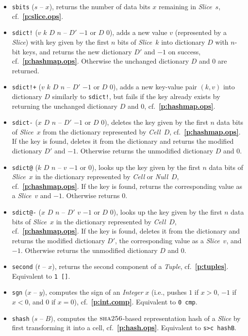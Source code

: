 \documentclass[12pt,oneside]{article}
\def\refpoint#1{{\rm\textbf{\ref{#1}}}}
\let\ptref=\refpoint
\def\opsc#1{\operatorname{\textsc{#1}}}
\def\Sha{\opsc{sha256}}
\begin{document}
\begin{itemize}
\item {\tt sbits} ($s$ -- $x$), returns the number of data bits $x$ remaining in {\em Slice}~$s$, cf.~\ptref{p:slice.ops}.
\item {\tt sdict!} ($v$ $k$ $D$ $n$ -- $D'$ $-1$ or $D$ $0$), adds a new value $v$ (represented by a {\em Slice\/}) with key given by the first $n$ bits of {\em Slice\/}~$k$ into dictionary $D$ with $n$-bit keys, and returns the new dictionary $D'$ and $-1$ on success, cf.~\ptref{p:hashmap.ops}. Otherwise the unchanged dictionary $D$ and $0$ are returned.
\item {\tt sdict!+} ($v$ $k$ $D$ $n$ -- $D'$ $-1$ or $D$ $0$), adds a new key-value pair $(k,v)$ into dictionary $D$ similarly to {\tt sdict!}, but fails if the key already exists by returning the unchanged dictionary $D$ and $0$, cf.~\ptref{p:hashmap.ops}.
\item {\tt sdict-} ($x$ $D$ $n$ -- $D'$ $-1$ or $D$ $0$), deletes the key given by the first $n$ data bits of {\em Slice\/}~$x$ from the dictionary represented by {\em Cell\/}~$D$, cf.~\ptref{p:hashmap.ops}. If the key is found, deletes it from the dictionary and returns the modified dictionary $D'$ and $-1$. Otherwise returns the unmodified dictionary $D$ and $0$.
\item {\tt sdict@} ($k$ $D$ $n$ -- $v$ $-1$ or $0$), looks up the key given by the first $n$ data bits of {\em Slice\/}~$x$ in the dictionary represented by {\em Cell\/} or {\em Null\/}~$D$, cf.~\ptref{p:hashmap.ops}. If the key is found, returns the corresponding value as a {\em Slice\/}~$v$ and $-1$. Otherwise returns $0$.
\item {\tt sdict@-} ($x$ $D$ $n$ -- $D'$ $v$ $-1$ or $D$ $0$), looks up the key given by the first $n$ data bits of {\em Slice\/}~$x$ in the dictionary represented by {\em Cell\/}~$D$, cf.~\ptref{p:hashmap.ops}. If the key is found, deletes it from the dictionary and returns the modified dictionary $D'$, the corresponding value as a {\em Slice\/}~$v$, and $-1$. Otherwise returns the unmodified dictionary $D$ and $0$.
\item {\tt second} ($t$ -- $x$), returns the second component of a {\em Tuple}, cf.~\ptref{p:tuples}. Equivalent to {\tt 1 []}.
\item {\tt sgn} ($x$ -- $y$), computes the sign of an {\em Integer\/} $x$ (i.e., pushes $1$ if $x>0$, $-1$ if $x<0$, and $0$ if $x=0$), cf.~\ptref{p:int.comp}. Equivalent to {\tt 0 cmp}.
\item {\tt shash} ($s$ -- $B$), computes the $\Sha$-based representation hash of a {\em Slice\/} by first transforming it into a cell, cf.~\ptref{p:hash.ops}. Equivalent to {\tt s>c hashB}.

\end{itemize}
\end{document}

